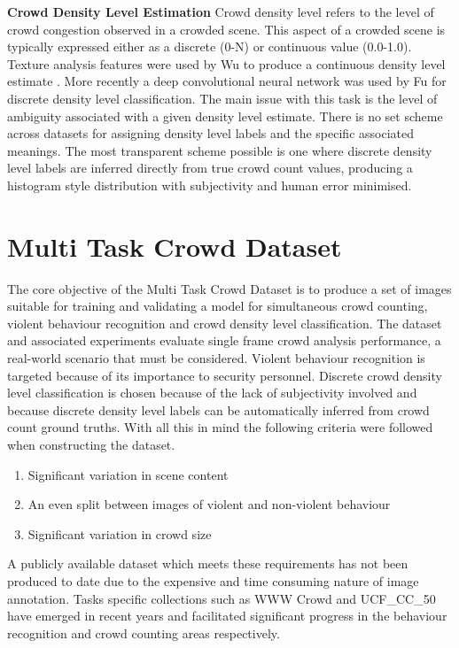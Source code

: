 \documentclass[10pt,twocolumn,letterpaper]{article}
\begin{document}
\textbf{Crowd Density Level Estimation} 
Crowd density level refers to the level of crowd congestion observed in a crowded scene. This aspect of a crowded scene is typically expressed either as a discrete (0-N) or continuous value (0.0-1.0). Texture analysis features were used by Wu \etal  to produce a continuous density level estimate \cite{wu2006crowd}. More recently a deep convolutional neural network was used by Fu \etal \cite{Fu2015} for discrete density level classification. The main issue with this task is the level of ambiguity associated with a given density level estimate.  There is no set scheme across datasets for assigning density level labels and the specific associated meanings. The most transparent scheme possible is one where discrete density level labels are inferred directly from true crowd count values, producing a histogram style distribution with subjectivity and human error minimised.


\section{Multi Task Crowd Dataset}
The core objective of the Multi Task Crowd Dataset is to produce a set of images suitable for training and validating a model for simultaneous crowd counting, violent behaviour recognition and crowd density level classification. The dataset and associated experiments  evaluate single frame crowd analysis performance, a real-world scenario that must be considered. Violent behaviour recognition is targeted because of its importance to security personnel. Discrete crowd density level classification is chosen because of the lack of subjectivity involved and because discrete density level labels can be automatically inferred from crowd count ground truths. With all this in mind the following criteria were followed when constructing the dataset.

\begin{enumerate}
  \item Significant variation in scene content
  \item An even split between images of violent and non-violent behaviour
  \item Significant variation in crowd size
\end{enumerate}

A publicly available dataset which meets these requirements has not been produced to date due to the expensive and time consuming nature of image annotation. Tasks specific collections such as WWW Crowd \cite{Kang2015} and UCF\_CC\_50 \cite{idrees2013multi} have emerged in recent years and facilitated significant progress in the behaviour recognition and crowd counting areas respectively.
\end{document}

